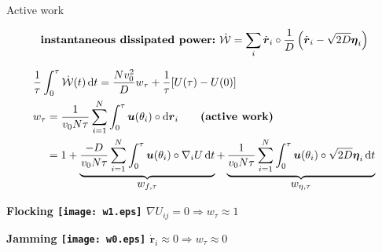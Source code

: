 \documentclass{beamer}
\begin{document}
\begin{frame}[t]{Active work}

\vspace{-22pt}

\begin{align*}
\text{\bf instantaneous dissipated power:}~ \dot{\mathcal{W}} = \sum_{i} \dot{\boldsymbol{r}}_i \circ \frac{1}{D} \left(\dot{\boldsymbol{r}}_i - \sqrt{2D} \boldsymbol{\eta}_i\right)
\end{align*}

\pause

\begin{align*}
&\frac{1}{\tau} \int_0^{\tau} \dot{\mathcal{W}}(t) \, \mathrm{d}t = \frac{N v_0^2}{D}  w_{\tau}  + \frac{1}{\tau} [ U(\tau) - U(0) ]\\
&\begin{aligned}w_\tau &= \frac{1}{v_0 N\tau} \sum_{i=1}^N \int_0^\tau \boldsymbol{u}(\theta_i) \circ \mathrm{d}\boldsymbol{r}_i \qquad \text{\bf (active work)}\\
&= 1 + \underbrace{\frac{-D}{v_0 N \tau} \sum_{i=1}^N \int_0^{\tau} \boldsymbol{u}(\theta_i) \circ \nabla_i U \, \mathrm{d} t}_{\displaystyle w_{f, \tau}} + \underbrace{\frac{1}{v_0 N \tau} \sum_{i=1}^N \int_0^{\tau} \boldsymbol{u}(\theta_i) \circ \sqrt{2 D} \boldsymbol{\eta}_i \, \mathrm{d}t}_{\displaystyle w_{\eta, \tau}}
\end{aligned}
\end{align*}

\pause

\hfill
\begin{minipage}{0.4\linewidth}
\centering
\bf Flocking
\texttt{[image: w1.eps]}
$\nabla U_{ij} = 0 \Rightarrow w_{\tau} \approx 1$
\end{minipage}
\hfill
\begin{minipage}{0.4\linewidth}
\centering
\bf Jamming
\texttt{[image: w0.eps]}
$\dot{\boldsymbol{r}}_i \approx 0 \Rightarrow w_{\tau} \approx 0$
\end{minipage}
\hfill\hfill

\end{frame}
\end{document}
